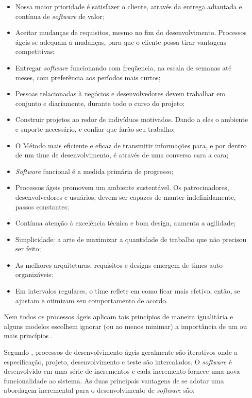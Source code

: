 \begin{itemize}
    \item Nossa maior prioridade é satisfazer o cliente, através da entrega adiantada e contínua de \textit{software} de valor;
    \item Aceitar mudanças de requisitos, mesmo no fim do desenvolvimento. Processos ágeis se adequam a mudanças, para que o cliente possa tirar vantagens competitivas;
    \item Entregar \textit{software} funcionando com freqüencia, na escala de semanas até meses, com preferência aos períodos mais curtos;
    \item Pessoas relacionadas à negócios e desenvolvedores devem trabalhar em conjunto e diariamente, durante todo o curso do projeto;
    \item Construir projetos ao redor de indivíduos motivados. Dando a eles o ambiente e suporte necessário, e confiar que farão seu trabalho;
    \item O Método mais eficiente e eficaz de transmitir informações para, e por dentro de um time de desenvolvimento, é através de uma conversa cara a cara;
    \item \textit{Software} funcional é a medida primária de progresso;
    \item Processos ágeis promovem um ambiente sustentável. Os patrocinadores, desenvolvedores e usuários, devem ser capazes de manter indefinidamente, passos constantes;
    \item Contínua atenção à excelência técnica e bom design, aumenta a agilidade;
    \item Simplicidade: a arte de maximizar a quantidade de trabalho que não precisou ser feito;
    \item As melhores arquiteturas, requisitos e designs emergem de times auto-organizáveis;
    \item Em intervalos regulares, o time reflete em como ficar mais efetivo, então, se ajustam e otimizam seu comportamento de acordo.
\end{itemize}

Nem todos os processos ágeis aplicam tais princípios de maneira igualitária e alguns modelos escolhem ignorar (ou ao menos minimar) a importância de um ou mais princípios \cite{pressman_2009}.

Segundo \cite{sommerville_2006}, processos de desenvolvimento ágeis geralmente são iterativos onde a
especificação, projeto, desenvolvimento e teste são intercalados. O \textit{software} é desenvolvido
em uma série de incrementos e cada incremento fornece uma nova funcionalidade ao sistema. As duas principais
vantagens de se adotar uma abordagem incremental para o desenvolvimento de \textit{software} são:

